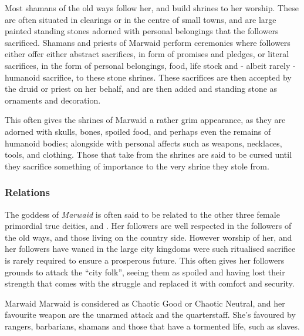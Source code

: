 Most shamans of the old ways follow her, and build shrines to her worship.
These are often situated in clearings or in the centre of small towns, and are
large painted standing stones adorned with personal belongings that the
followers sacrificed. Shamans and priests of Marwaid perform ceremonies where
followers either offer either abstract sacrifices, in form of promises and
pledges, or literal sacrifices, in the form of personal belongings, food, life
stock and - albeit rarely - humanoid sacrifice, to these stone shrines. These
sacrifices are then accepted by the druid or priest on her behalf, and are
then added and standing stone as ornaments and decoration.

This often gives the shrines of Marwaid a rather grim appearance, as they are
adorned with skulls, bones, spoiled food, and perhaps even the remains of
humanoid bodies; alongside with personal affects such as weapons, necklaces,
tools, and clothing. Those that take from the shrines are said to be cursed
until they sacrifice something of importance to the very shrine they stole
from.

\subsubsection{Relations}

The goddess of \emph{Marwaid} is often said to be related to the other three
female primordial true deities,  and .
Her followers are well respected in the followers of the old ways, and those
living on the country side. However worship of her, and her followers have
waned in the large city kingdoms were such ritualised sacrifice is rarely
required to ensure a prosperous future. This often gives her followers grounds
to attack the ``city folk'', seeing them as spoiled and having lost their
strength that comes with the struggle and replaced it with comfort and
security.

\begin{35e}{Marwaid}
  Marwaid is considered as Chaotic Good or Chaotic Neutral, and her favourite
  weapon are the unarmed attack and the quarterstaff. She's favoured by rangers,
  barbarians, shamans and those that have a tormented life, such as slaves.
\end{35e}
